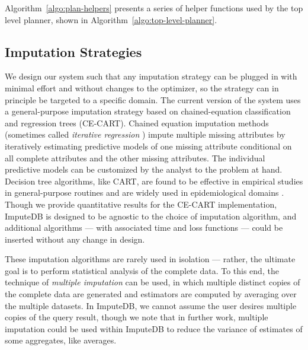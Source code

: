 Algorithm~\ref{algo:plan-helpers} presents a series of helper functions used by the top level planner, shown in Algorithm~\ref{algo:top-level-planner}.

\begin{algorithm}

\end{algorithm}

\begin{algorithm}

\end{algorithm}

\begin{algorithm}

\end{algorithm}

\subsection{Imputation Strategies}

We design our system such that any imputation strategy can be plugged in with minimal effort
and without changes to the optimizer, so the strategy can in principle be targeted to a
specific domain. The current version of the system uses a general-purpose imputation
strategy based on chained-equation classification and regression trees (CE-CART). Chained
equation imputation methods \cite{vanbuuren2011mice} (sometimes called \textit{iterative
regression} \cite{gelman2006data}) impute multiple missing attributes by
iteratively estimating predictive models of one missing attribute conditional on all
complete attributes and the other missing attributes. The individual predictive models can
be customized by the analyst to the problem at hand. Decision tree algorithms, like CART,
are found to be effective \cite{akande2015empirical} in empirical studies in general-purpose
routines and are widely used in epidemiological domains \cite{burgette2010multiple}. Though
we provide quantitative results for the CE-CART implementation, ImputeDB is designed to be
agnostic to the choice of imputation algorithm, and additional algorithms --- with
associated time and loss functions --- could be inserted without any change in design.

These imputation algorithms are rarely used in isolation --- rather, the ultimate goal is to
perform statistical analysis of the complete data. To this end, the technique of
\textit{multiple imputation} can be used, in which multiple distinct copies of the complete
data are generated and estimators are computed by averaging over the multiple datasets. In
ImputeDB, we cannot assume the user desires multiple copies of the query result, though we
note that in further work, multiple imputation could be used within ImputeDB to reduce the
variance of estimates of some aggregates, like averages.

